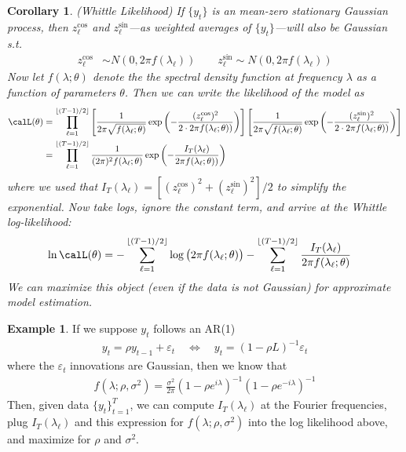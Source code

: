 \documentclass[12pt]{article}
\theoremstyle{plain}
\newtheorem{cor}[thm]{Corollary}
\theoremstyle{definition}
\newtheorem{ex}[thm]{Example}
\theoremstyle{remark}
\newcommand{\tT}{_{t=1}^T}
\begin{document}
\begin{cor}\emph{(Whittle Likelihood)}
If $\{y_t\}$ is an mean-zero stationary Gaussian
process, then $z^{\cos}_\ell$ and $z^{\sin}_\ell$---as weighted averages
of $\{y_t\}$---will also be Gaussian s.t.
\begin{align*}
  z_\ell^{\cos} &\sim N(0,2\pi f(\lambda_\ell))
  \qquad
  z_\ell^{\sin} \sim N(0,2\pi f(\lambda_\ell))
\end{align*}
Now let $f(\lambda;\theta)$ denote the the spectral density function at
frequency $\lambda$ as a function of parameters $\theta$.
Then we can write the likelihood of the model as
\begin{align*}
  \calL(\theta)
  &= \prod_{\ell=1}^{\lfloor(T-1)/2\rfloor}
  \left[
  \frac{1}{2\pi \sqrt{f(\lambda_\ell;\theta)}}
  \exp\left(
    -\frac{(z_\ell^{\cos})^2}{2\cdot 2\pi f(\lambda_\ell;\theta))}
  \right)
  \right]
  \left[
  \frac{1}{2\pi \sqrt{f(\lambda_\ell;\theta)}}
  \exp\left(
    -\frac{(z_\ell^{\sin})^2}{2\cdot 2\pi f(\lambda_\ell;\theta))}
  \right)
  \right]
  \\
  &= \prod_{\ell=1}^{\lfloor(T-1)/2\rfloor}
  \frac{1}{(2\pi)^2 f(\lambda_\ell;\theta)}
  \exp\left(
    -\frac{I_T(\lambda_\ell)}{2\pi f(\lambda_\ell;\theta))}
  \right)
\end{align*}
where we used that
$I_T(\lambda_\ell)=[(z_\ell^{\cos})^2+(z_\ell^{\sin})^2]/2$ to simplify
the exponential.
\clearpage
Now take logs, ignore the constant term, and arrive at the Whittle
log-likelihood:
\begin{align*}
  \ln\calL(\theta)
  &=
  -\sum_{\ell=1}^{\lfloor(T-1)/2\rfloor}
    \log\big(2\pi f(\lambda_\ell;\theta)\big)
  -\sum_{\ell=1}^{\lfloor(T-1)/2\rfloor}
  \frac{I_T(\lambda_\ell)}{2\pi f(\lambda_\ell;\theta)}
\end{align*}
We can maximize this object (even if the data is not Gaussian) for
approximate model estimation.
\end{cor}

\begin{ex}
If we suppose $y_t$ follows an AR(1)
\begin{align*}
  y_t=\rho y_{t-1}+\varepsilon_t
  \quad\iff\quad
  y_t = (1-\rho L)^{-1}\varepsilon_t
\end{align*}
where the $\varepsilon_t$ innovations are Gaussian, then we know that
\begin{align*}
  f(\lambda; \rho,\sigma^2)
  =
  \frac{\sigma^2}{2\pi}
  (1-\rho e^{i\lambda})^{-1}
  (1-\rho e^{-i\lambda})^{-1}
\end{align*}
Then, given data $\{y_t\}\tT$, we can compute $I_T(\lambda_\ell)$ at the
Fourier frequencies, plug $I_T(\lambda_\ell)$ and this expression for
$f(\lambda;\rho,\sigma^2)$ into the log likelihood above, and maximize
for $\rho$ and $\sigma^2$.
\end{ex}
\end{document}
